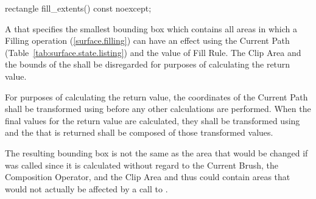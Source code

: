 \begin{itemdecl}
rectangle fill_extents() const noexcept;
\end{itemdecl}
\begin{itemdescr}
\pnum
\returns
A  that specifies the smallest bounding box which contains all areas in which a Filling operation (\ref{surface.filling}) can have an effect using the Current Path (Table~\ref{tab:surface.state.listing}) and the value of Fill Rule. The Clip Area and the bounds of the \underlyingsurface shall be disregarded for purposes of calculating the return value.

\pnum
For purposes of calculating the return value, the coordinates of the Current Path shall be transformed using  before any other calculations are performed. When the final values for the return value are calculated, they shall be transformed using  and the  that is returned shall be composed of those transformed values.

\pnum
\realnotes
The resulting bounding box is not the same as the area that would be changed if  was called since it is calculated without regard to the Current Brush, the Composition Operator, and the Clip Area and thus could contain areas that would not actually be affected by a call to .
\end{itemdescr}

